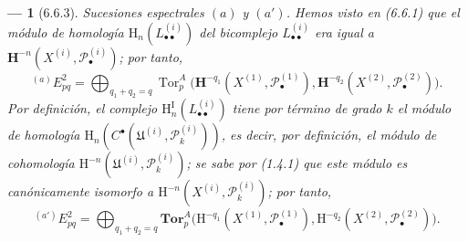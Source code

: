 \documentclass[10pt,oneside,openany]{book}
\theoremstyle{egaenv}\newtheorem*{env}{---}
\theoremstyle{egastatement}
\theoremstyle{egadescription}
\begin{document}
\begin{env}[6.6.3]
\label{III.6.6.3}
\emph{Sucesiones espectrales $(a)$ y $(a')$.} Hemos visto en (6.6.1) que el
módulo de homología $\mathrm H_n(L_{\bullet\bullet}^{(i)})$ del bicomplejo
$L_{\bullet\bullet}^{(i)}$ era igual a
$\mathbf H^{-n}(X^{(i)},\mathscr P_\bullet^{(i)})$; por tanto,
\[
  {}^{(a)}E_{pq}^2
  =\bigoplus_{q_1+q_2=q}
   \operatorname{Tor}_p^A
   \bigl(\mathbf H^{-q_1}(X^{(1)},\mathscr P_\bullet^{(1)}),
         \mathbf H^{-q_2}(X^{(2)},\mathscr P_\bullet^{(2)})\bigr).
\]
Por definición, el complejo
$\mathrm H_n^{\mathrm I}(L_{\bullet\bullet}^{(i)})$ tiene por término de grado
$k$ el módulo de homología
$\mathrm H_n(C^\bullet(\mathfrak U^{(i)},\mathscr P_k^{(i)}))$, es decir,
por definición, el módulo de \emph{cohomología}
$\mathrm H^{-n}(\mathfrak U^{(i)},\mathscr P_k^{(i)})$; se sabe por (1.4.1)
que este módulo es canónicamente isomorfo a
$\mathrm H^{-n}(X^{(i)},\mathscr P_k^{(i)})$; por tanto,
\[
  {}^{(a')}E_{pq}^2
  =\bigoplus_{q_1+q_2=q}
   \mathbf{Tor}_p^A
   \bigl(\mathrm H^{-q_1}(X^{(1)},\mathscr P_\bullet^{(1)}),
         \mathrm H^{-q_2}(X^{(2)},\mathscr P_\bullet^{(2)})\bigr).
\]
\end{env}
\end{document}
